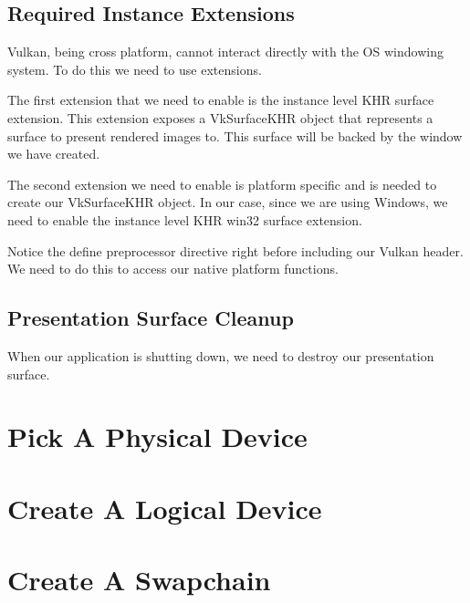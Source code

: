 \subsection{Required Instance Extensions}

Vulkan, being cross platform, cannot interact directly with the OS windowing system.
To do this we need to use extensions.

The first extension that we need to enable is the instance level KHR surface extension.
This extension exposes a VkSurfaceKHR object that represents a surface to present
rendered images to.
This surface will be backed by the window we have created.

The second extension we need to enable is platform specific and is needed
to create our VkSurfaceKHR object.
In our case, since we are using Windows, we need to enable the instance level KHR win32
surface extension.

\begin{minipage}{\linewidth}{\noindent}
    
\end{minipage}

Notice the define preprocessor directive right before including our Vulkan header.
We need to do this to access our native platform functions.

\subsection{Presentation Surface Cleanup}

When our application is shutting down, we need to destroy our presentation surface.

\begin{minipage}{\linewidth}{\noindent}
    
\end{minipage}

\section{Pick A Physical Device}

\section{Create A Logical Device}

\section{Create A Swapchain}

